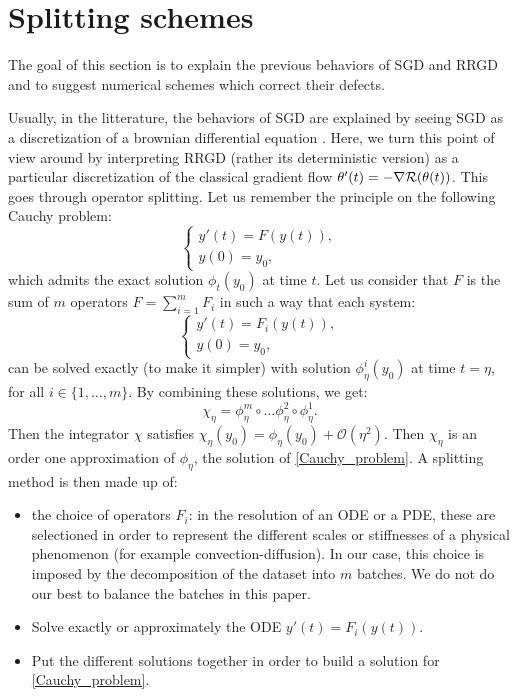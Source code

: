 \section{Splitting schemes}
\label{section_splitting_schemes}

The goal of this section is to explain the previous behaviors of SGD and RRGD and to suggest numerical schemes which correct their defects. 

Usually, in the litterature, the behaviors of SGD are explained by seeing SGD as a discretization of a brownian differential equation \cite{SDE_comparison,SDE_modified,SDE_edp,malladi_adam,hu2018diffusion,flat_minima_exponential,yang2020fast,sgd_implicit_regularisation,sgd_implicit_regularisation2}. Here, we turn this point of view around by interpreting RRGD (rather its deterministic version) as a particular discretization of the classical gradient flow $\theta'(t)=-\nabla \mathcal{R}(\theta(t))$. This goes through operator splitting. Let us remember the principle on the following Cauchy problem:
\begin{equation}
	\left\{
	\begin{array}{ll}
		y'(t) = F(y(t)), \\
		y(0) = y_0,
	\end{array}
	\right.
	\label{Cauchy_problem}
\end{equation}
which admits the exact solution $\phi_t(y_0)$ at time $t$. Let us consider that $F$ is the sum of $m$ operators $F=\displaystyle{\sum_{i=1}^m}F_i$ in such a way that each system:
\begin{equation*}
	\left\{
	\begin{array}{ll}
		y'(t) = F_i(y(t)), \\
		y(0) = y_0,
	\end{array}
	\right.
\end{equation*}
can be solved exactly (to make it simpler)  with solution $\phi_{\eta}^i(y_0)$ at time $t=\eta$, for all $i\in \{1,\dots,m\}$. By combining these solutions, we get:
\begin{equation}
	\chi_{\eta} = \phi_{\eta}^m \circ \dots \phi_{\eta}^2 \circ \phi_{\eta}^1.
	\label{splitting_lie_trotter}
\end{equation} 
Then the integrator $\chi$ satisfies $\chi_{\eta}(y_0) = \phi_{\eta}(y_0) + \mathcal{O}(\eta^2)$. Then $\chi_{\eta}$ is an order one approximation of $\phi_{\eta}$, the solution of \eqref{Cauchy_problem}. A splitting method is then made up of:
\begin{itemize}
	\item the choice of operators $F_i$: in the resolution of an ODE or a PDE, these are selectioned in order to represent the different scales or stiffnesses of a physical phenomenon (for example convection-diffusion). In our case, this choice is imposed by the decomposition of the dataset into $m$ batches. We do not do our best to balance the batches in this paper.
	\item Solve exactly or approximately the ODE $y'(t)=F_i(y(t))$.
	\item Put the different solutions together in order to build a solution for \eqref{Cauchy_problem}. 
\end{itemize}
